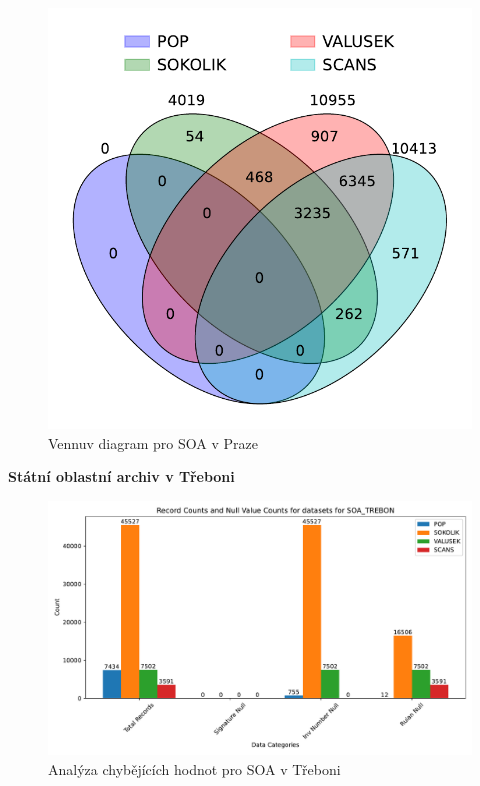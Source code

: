 \begin{figure}[htbp]
\centering
    \includegraphics[scale=.5]{obrazky-figures/dataAnalysis/soaPraha/Venn_4.pdf}
    \caption{Vennuv diagram pro SOA v Praze}
\end{figure}


\newpage
\noindent\textbf{Státní oblastní archiv v Třeboni}\\

\begin{figure}[htbp]
\centering
    \includegraphics[scale=.5]{obrazky-figures/dataAnalysis/soaTrebon/missingValues.pdf}
    \caption{Analýza chybějících hodnot pro SOA v Třeboni}
\end{figure}


